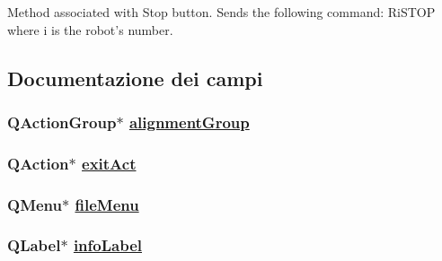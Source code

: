 Method associated with Stop button. Sends the following command: Ri\-STOP where i is the robot's number. 

\subsection{Documentazione dei campi}
\hypertarget{classMainWindow_76d93e5045032189c41520235a2196b9}{
\subsubsection[alignmentGroup]{\setlength{\rightskip}{0pt plus 5cm}QAction\-Group$\ast$ \hyperlink{classMainWindow_76d93e5045032189c41520235a2196b9}{alignment\-Group}}}
\label{classMainWindow_76d93e5045032189c41520235a2196b9}


\hypertarget{classMainWindow_d618b0cff61434478d762e93add5189e}{
\subsubsection[exitAct]{\setlength{\rightskip}{0pt plus 5cm}QAction$\ast$ \hyperlink{classMainWindow_d618b0cff61434478d762e93add5189e}{exit\-Act}}}
\label{classMainWindow_d618b0cff61434478d762e93add5189e}


\hypertarget{classMainWindow_db1ab65d1aecac73e58f48557c143b2e}{
\subsubsection[fileMenu]{\setlength{\rightskip}{0pt plus 5cm}QMenu$\ast$ \hyperlink{classMainWindow_db1ab65d1aecac73e58f48557c143b2e}{file\-Menu}}}
\label{classMainWindow_db1ab65d1aecac73e58f48557c143b2e}


\hypertarget{classMainWindow_1778899fb8e16670083da66e055500d0}{
\subsubsection[infoLabel]{\setlength{\rightskip}{0pt plus 5cm}QLabel$\ast$ \hyperlink{classMainWindow_1778899fb8e16670083da66e055500d0}{info\-Label}}}
\label{classMainWindow_1778899fb8e16670083da66e055500d0}


